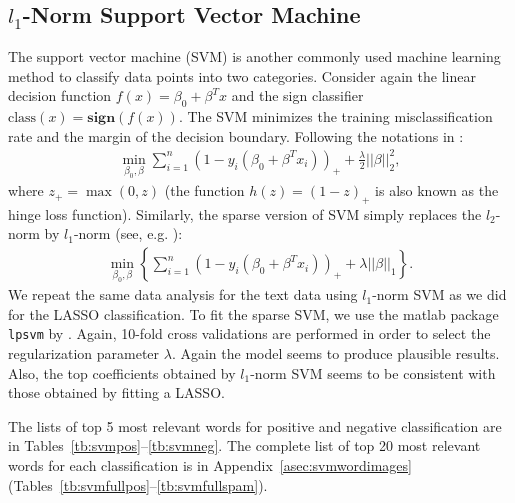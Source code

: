 \documentclass[11pt]{article}
\newcommand{\note}[1]{{\em \color{red} #1}}
\newcommand{\1}[1]{{\mathbf 1}\left\{#1\right\}}        %
\begin{document}
\subsection{$l_1$-Norm Support Vector Machine}

The support vector machine (SVM) is another commonly used machine learning method to classify data points into two categories. Consider again the linear decision function $f(x) = \beta_0 + \beta^T x$ and the sign classifier $\text{class}(x) = \textbf{sign} (f(x))$. The SVM minimizes the training misclassification rate and the margin of the decision boundary. Following the notations in \cite{hastie2004entire}:
\begin{align}
\label{eq:l2svm}
\min_{\beta_0,\beta} \sum_{i=1}^n(1-y_i(\beta_0+\beta^Tx_i))_+ + \frac{\lambda}{2} ||\beta||_2^2,
\end{align}
where $z_+ = \max(0,z)$ (the function $h(z) = (1-z)_+$ is also known as the hinge loss function). Similarly, the sparse version of SVM simply replaces the $l_2$-norm by $l_1$-norm (see, e.g. \cite{zhu20041}):
\begin{align*}
\label{eq:l1svm}
\min_{\beta_0,\beta} \left\{ \sum_{i=1}^n(1-y_i(\beta_0+\beta^Tx_i))_+ + \lambda ||\beta||_1\right\}. 
\end{align*}
We repeat the same data analysis for the text data using $l_1$-norm SVM as we did for the LASSO classification. To fit the sparse SVM, we use the matlab package {\tt lpsvm} by \cite{fung2004feature}. Again, 10-fold cross validations are performed in order to select the regularization parameter $\lambda$. Again the model seems to produce plausible results. Also, the top coefficients obtained by $l_1$-norm SVM seems to be consistent with those obtained by fitting a LASSO.  

%

The lists of top 5 most relevant words for positive and negative classification are in Tables~\ref{tb:svmpos}--\ref{tb:svmneg}.
The complete list of top 20 most relevant words for each classification is in Appendix~\ref{asec:svmwordimages} (Tables~\ref{tb:svmfullpos}--\ref{tb:svmfullspam}).
\end{document}
